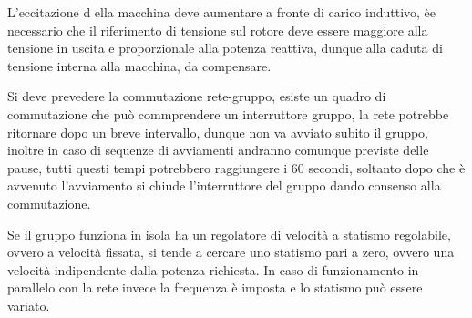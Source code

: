 L'eccitazione d ella macchina deve aumentare a fronte di carico induttivo, èe 
necessario che il riferimento di tensione sul rotore deve essere maggiore alla 
tensione in uscita e proporzionale alla potenza reattiva, dunque alla caduta di 
tensione interna alla macchina, da compensare.

Si deve prevedere la commutazione rete-gruppo, esiste un quadro di commutazione 
che può commprendere un interruttore gruppo, la rete potrebbe ritornare dopo un 
breve intervallo, dunque non va avviato subito il gruppo, inoltre in caso di 
sequenze di avviamenti andranno comunque previste delle pause, tutti questi 
tempi potrebbero raggiungere i 60 secondi, soltanto dopo che è avvenuto 
l'avviamento si chiude l'interruttore del gruppo dando consenso alla 
commutazione.

Se il gruppo funziona in isola ha un regolatore di velocità a statismo 
regolabile, ovvero a velocità fissata, si tende a cercare uno statismo pari a 
zero, ovvero una velocità indipendente dalla potenza richiesta. In caso di 
funzionamento in parallelo con la rete invece la frequenza è imposta e lo 
statismo può essere variato.

